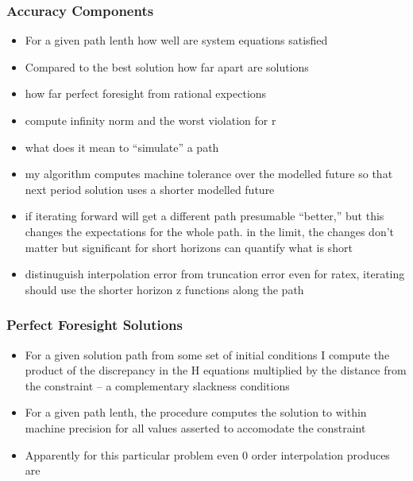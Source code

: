 \documentclass{beamer}
\begin{document}


%      
    \begin{frame}
      \frametitle{Accuracy Components}
      \begin{itemize}
      \item For a given path lenth how well are system equations satisfied
      \item Compared to the best solution how far apart are solutions
      \item how far perfect foresight from rational expections
      \item compute infinity norm and the worst violation for r
      \item what does it mean to ``simulate'' a path
      \item my algorithm computes machine tolerance over the modelled future so that next period solution uses a shorter modelled future
      \item if iterating forward will get a different path presumable ``better,'' but this changes the expectations for the whole path. in the limit, the
changes don't matter but significant for short horizons can quantify what is short
\item distinuguish interpolation error from truncation error even for ratex, iterating should use the shorter horizon z functions along the path
      \end{itemize}
    \end{frame}
    \begin{frame}
      \frametitle{Perfect Foresight Solutions}
      \begin{itemize}
\item For a given solution path  from some set of initial conditions 
I compute the product of the discrepancy in the H equations multiplied by 
the distance from the constraint -- a complementary slackness conditions
      \item For a given path lenth, the procedure computes the solution to within machine precision for all values asserted to accomodate the constraint
      \item Apparently for this particular problem  even 0 order interpolation produces
are 
      \end{itemize}
    \end{frame}
\end{document}
